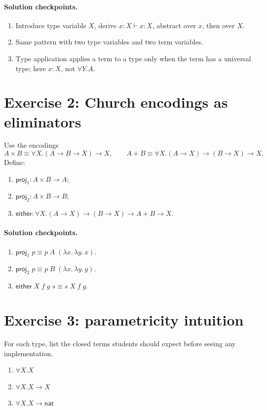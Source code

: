 \documentclass[11pt]{article}
\newcommand{\lam}[1]{\lambda #1.\,}
\newcommand{\nat}{\mathsf{nat}}
\begin{document}
\paragraph{Solution checkpoints.}
\begin{enumerate}[nosep]
  \item Introduce type variable $X$, derive $x:X \vdash x:X$, abstract over $x$, then over $X$.
  \item Same pattern with two type variables and two term variables.
  \item Type application applies a term to a type only when the term has a universal type; here $x : X$, not $\forall Y.A$.
\end{enumerate}

\section*{Exercise 2: Church encodings as eliminators}
Use the encodings
\[
  A \times B \equiv \forall X. (A \to B \to X) \to X,
  \qquad
  A + B \equiv \forall X. (A \to X) \to (B \to X) \to X.
\]
Define:
\begin{enumerate}
  \item $\mathsf{proj}_1 : A \times B \to A$;
  \item $\mathsf{proj}_2 : A \times B \to B$;
  \item $\mathsf{either} : \forall X. (A \to X) \to (B \to X) \to A + B \to X$.
\end{enumerate}

\paragraph{Solution checkpoints.}
\begin{enumerate}[nosep]
  \item $\mathsf{proj}_1\;p \equiv p\;A\;(\lam{x}\lam{y}x)$.
  \item $\mathsf{proj}_2\;p \equiv p\;B\;(\lam{x}\lam{y}y)$.
  \item $\mathsf{either}\;X\;f\;g\;s \equiv s\;X\;f\;g$.
\end{enumerate}

\section*{Exercise 3: parametricity intuition}
For each type, list the closed terms students should expect before seeing any implementation.
\begin{enumerate}
  \item $\forall X. X$
  \item $\forall X. X \to X$
  \item $\forall X. X \to \nat$
\end{enumerate}
\end{document}
